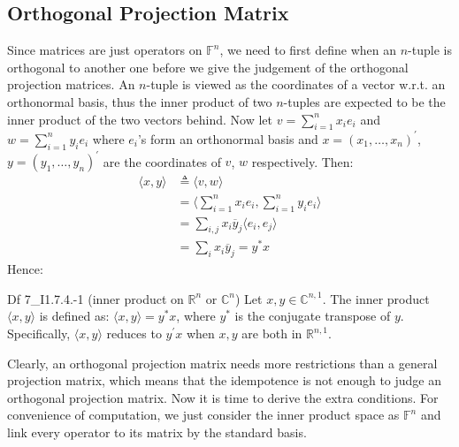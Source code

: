 \documentclass{article}
\begin{document}
\subsection{Orthogonal Projection Matrix}
Since matrices are just operators on $\mathbb{F}^n$, we need to first define when an $n$-tuple is orthogonal to another one before we give the judgement of the orthogonal projection matrices. An $n$-tuple is viewed as the coordinates of a vector w.r.t. an orthonormal basis, thus the inner product of two $n$-tuples are expected to be the inner product of the two vectors behind. Now let $v=\sum_{i=1}^n x_ie_i$ and $w=\sum_{i=1}^n y_ie_i$ where $e_i$'s form an orthonormal basis and $x=(x_1, \dots, x_n)^\prime$, $y=(y_1, \dots, y_n)^\prime$ are the coordinates of $v$, $w$ respectively. Then:
$$
\begin{aligned}
    \langle x, y\rangle &\triangleq \langle v, w\rangle \\
    &= \langle \sum_{i=1}^n x_ie_i, \sum_{i=1}^n y_ie_i\rangle \\
    &= \sum_{i,j} x_i\overline{y}_j\langle e_i,e_j\rangle \\
    &= \sum_{i} x_i\overline{y}_j = y^\ast x
\end{aligned}
$$
Hence: 
\begin{Df}{Df 7\_I1.7.4.-1 (inner product on $\mathbb{R}^n$ or $\mathbb{C}^n$)}
    Let $x, y\in\mathbb{C}^{n,1}$. The inner product $\langle x, y\rangle$ is defined as: $\langle x, y\rangle = y^\ast x$, where $y^\ast$ is the conjugate transpose of $y$. Specifically, $\langle x, y\rangle$ reduces to $y^\prime x$ when $x, y$ are both in $\mathbb{R}^{n,1}$.
\end{Df}

Clearly, an orthogonal projection matrix needs more restrictions than a general projection matrix, which means that the idempotence is not enough to judge an orthogonal projection matrix. Now it is time to derive the extra conditions. For convenience of computation, we just consider the inner product space as $\mathbb{F}^n$ and link every operator to its matrix by the standard basis.
\end{document}
